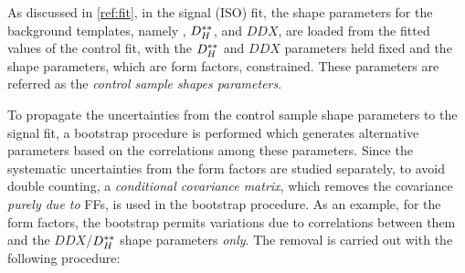 As discussed in \cref{ref:fit},
in the signal (ISO) fit,
the shape parameters for the background templates,
namely \Dstst, $D^{**}_H$, and $DDX$,
are loaded from the fitted values of the control fit,
with the $D^{**}_H$ and $DDX$ parameters held fixed and the \Dstst
shape parameters,
which are form factors,
constrained.
These parameters are referred as the
\emph{control sample shapes parameters}.

To propagate the uncertainties from the control sample shape parameters to
the signal fit,
a bootstrap procedure is performed which generates alternative parameters based
on the correlations among these parameters.
Since the systematic uncertainties from the \Dstst form factors are
studied separately,
to avoid double counting,
a \emph{conditional covariance matrix},
which removes the covariance \emph{purely due to} \Dstst FFs,
is used in the bootstrap procedure.
As an example,
for the \Dstst form factors,
the bootstrap permits variations due to
correlations between them and the $DDX$/$D^{**}_H$ shape parameters \emph{only}.
The removal is carried out with the following procedure:


